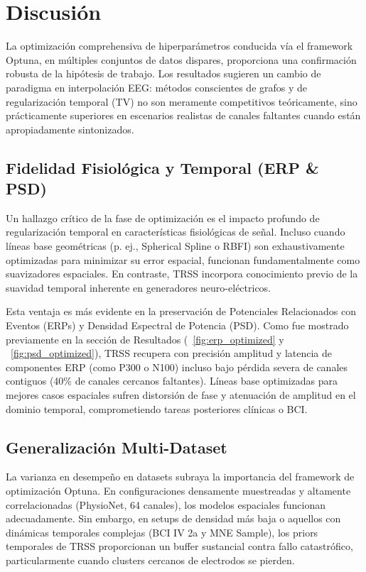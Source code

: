 \section{Discusión}

La optimización comprehensiva de hiperparámetros conducida vía el framework Optuna, en múltiples conjuntos de datos dispares, proporciona una confirmación robusta de la hipótesis de trabajo. Los resultados sugieren un cambio de paradigma en interpolación EEG: métodos conscientes de grafos y de regularización temporal (TV) no son meramente competitivos teóricamente, sino prácticamente superiores en escenarios realistas de canales faltantes cuando están apropiadamente sintonizados.

\subsection{Fidelidad Fisiológica y Temporal (ERP \& PSD)}
Un hallazgo crítico de la fase de optimización es el impacto profundo de regularización temporal en características fisiológicas de señal. Incluso cuando líneas base geométricas (p. ej., Spherical Spline o RBFI) son exhaustivamente optimizadas para minimizar su error espacial, funcionan fundamentalmente como suavizadores espaciales. En contraste, TRSS incorpora conocimiento previo de la suavidad temporal inherente en generadores neuro-eléctricos.

Esta ventaja es más evidente en la preservación de Potenciales Relacionados con Eventos (ERPs) y Densidad Espectral de Potencia (PSD). Como fue mostrado previamente en la sección de Resultados (\figurename~\ref{fig:erp_optimized} y \figurename~\ref{fig:psd_optimized}), TRSS recupera con precisión amplitud y latencia de componentes ERP (como P300 o N100) incluso bajo pérdida severa de canales contiguos (40\% de canales cercanos faltantes). Líneas base optimizadas para mejores casos espaciales sufren distorsión de fase y atenuación de amplitud en el dominio temporal, comprometiendo tareas posteriores clínicas o BCI.

\subsection{Generalización Multi-Dataset}
La varianza en desempeño en datasets subraya la importancia del framework de optimización Optuna. En configuraciones densamente muestreadas y altamente correlacionadas (PhysioNet, 64 canales), los modelos espaciales funcionan adecuadamente. Sin embargo, en setups de densidad más baja o aquellos con dinámicas temporales complejas (BCI IV 2a y MNE Sample), los priors temporales de TRSS proporcionan un buffer sustancial contra fallo catastrófico, particularmente cuando clusters cercanos de electrodos se pierden.

